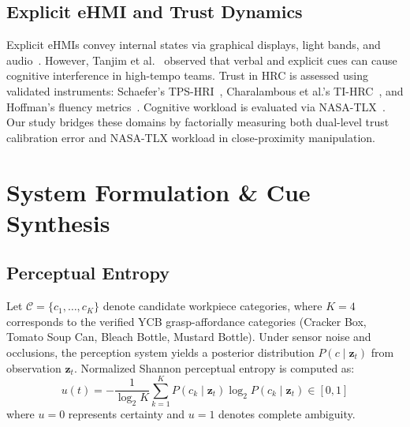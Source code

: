 \documentclass[conference]{IEEEtran}
\begin{document}
\subsection{Explicit eHMI and Trust Dynamics}
Explicit eHMIs convey internal states via graphical displays, light bands, and audio~\cite{porfirio2025uncertainty,schreiter2026legible,savery2020emotional}. However, Tanjim et al.~\cite{tanjim2025field,tanjim2025action} observed that verbal and explicit cues can cause cognitive interference in high-tempo teams. Trust in HRC is assessed using validated instruments: Schaefer's TPS-HRI~\cite{schaefer2016measuring}, Charalambous et al.'s TI-HRC~\cite{charalambous2016development}, and Hoffman's fluency metrics~\cite{hoffman2019evaluating}. Cognitive workload is evaluated via NASA-TLX~\cite{hart1988development}. Our study bridges these domains by factorially measuring both dual-level trust calibration error and NASA-TLX workload in close-proximity manipulation.

\section{System Formulation \& Cue Synthesis}

\subsection{Perceptual Entropy}
Let $\mathcal{C} = \{c_1, \dots, c_K\}$ denote candidate workpiece categories, where $K = 4$ corresponds to the verified YCB grasp-affordance categories (Cracker Box, Tomato Soup Can, Bleach Bottle, Mustard Bottle). Under sensor noise and occlusions, the perception system yields a posterior distribution $P(c \mid \mathbf{z}_t)$ from observation $\mathbf{z}_t$. Normalized Shannon perceptual entropy is computed as:
\begin{equation}
u(t) = - \frac{1}{\log_2 K} \sum_{k=1}^{K} P(c_k \mid \mathbf{z}_t) \log_2 P(c_k \mid \mathbf{z}_t) \in [0, 1]
\label{eq:entropy}
\end{equation}
where $u = 0$ represents certainty and $u = 1$ denotes complete ambiguity.
\end{document}
